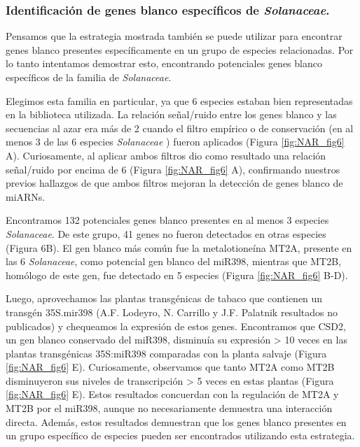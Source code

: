 \subsubsection{Identificación de genes blanco específicos de \textit{Solanaceae}.}

Pensamos que la estrategia mostrada también se puede utilizar para encontrar genes blanco presentes específicamente en un grupo de especies relacionadas.
Por lo tanto intentamos demostrar esto, encontrando potenciales genes blanco específicos de la familia de \textit{Solanaceae}. 

Elegimos esta familia en particular, ya que 6 especies estaban bien representadas en la biblioteca utilizada.
La relación señal/ruido entre los genes blanco y las secuencias al azar era más de 2 cuando el filtro empírico o de conservación (en al menos 3 de las 6 especies \textit{Solanaceae} ) fueron aplicados (Figura \ref{fig:NAR_fig6} A).
Curiosamente, al aplicar ambos filtros dio como resultado una relación señal/ruido por encima de 6 (Figura \ref{fig:NAR_fig6} A), confirmando nuestros previos hallazgos de que ambos filtros mejoran la detección de genes blanco de miARNs.

Encontramos 132 potenciales genes blanco presentes en al menos 3 especies \textit{Solanaceae}. De este grupo, 41 genes no fueron detectados en otras especies (Figura 6B).
El gen blanco más común fue la metalotioneína MT2A, presente en las 6 \textit{Solanaceae}, como potencial gen blanco del miR398, mientras que MT2B, homólogo de este gen, fue detectado en 5 especies (Figura \ref{fig:NAR_fig6} B-D).

Luego, aprovechamos las plantas transgénicas de tabaco que contienen un transgén 35S.mir398 (A.F. Lodeyro, N. Carrillo y J.F. Palatnik resultados no publicados) y chequeamos la expresión de estos genes.
Encontramos que CSD2, un gen blanco conservado del miR398, disminuía su expresión > 10 veces en las plantas transgénicas 35S:miR398 comparadas con la planta salvaje (Figura \ref{fig:NAR_fig6} E).
Curiosamente, observamos que tanto MT2A como MT2B  disminuyeron sus niveles de transcripción > 5 veces en estas plantas (Figura \ref{fig:NAR_fig6} E).
Estos resultados concuerdan con la regulación de MT2A y MT2B por el miR398, aunque no necesariamente demuestra una interacción directa.
Además, estos resultados demuestran que los genes blanco presentes en un grupo específico de especies pueden ser encontrados utilizando esta estrategia.


